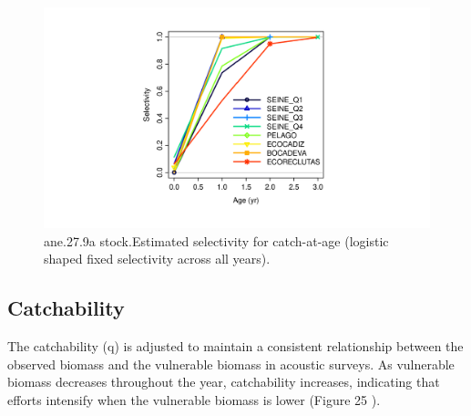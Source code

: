 \documentclass[
]{article}
\begin{document}
\begin{figure}[H]

{\centering \includegraphics[width=0.95\linewidth]{Report_SS3_quarter_with_age_data_S1.0_4FLEETS_files/figure-latex/unnamed-chunk-32-1} 

}

\caption{ane.27.9a stock.Estimated selectivity for catch-at-age (logistic shaped fixed selectivity across all years).}\label{fig:unnamed-chunk-32}
\end{figure}

\hypertarget{catchability-1}{%
\subsection{Catchability}\label{catchability-1}}

The catchability (q) is adjusted to maintain a consistent relationship
between the observed biomass and the vulnerable biomass in acoustic
surveys. As vulnerable biomass decreases throughout the year,
catchability increases, indicating that efforts intensify when the
vulnerable biomass is lower (Figure 25 ).
\end{document}
